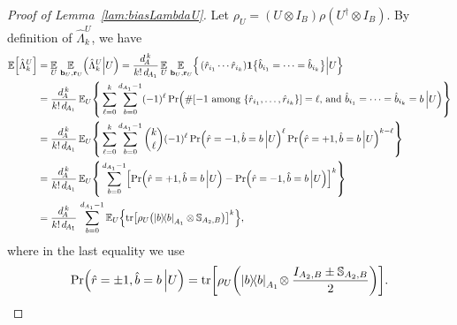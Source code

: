 \documentclass[aps,prl,twocolumn,nofootinbib,superscriptaddress,10pt]{revtex4-2}
\let\originalleft\left
\let\originalright\right
\renewcommand{\left}{\mathopen{}\mathclose\bgroup\originalleft}
\renewcommand{\right}{\aftergroup\egroup\originalright}
\def\E{ {\mathbb E} } %
\newcommand{\ketbra}[2]{\ensuremath{\left|#1\right\rangle\!\left\langle#2\right|}}
\DeclareMathOperator{\Tr}{tr}
\theoremstyle{plain}
\theoremstyle{definition}
\newcommand{\lref}[1]{Lemma~\ref{#1}}
\begin{document}
\begin{proof}[Proof of \lref{lam:biasLambdaU}]
Let $\rho_{U}=(U\otimes I_B)\rho(U^{\dag}\otimes I_B)$. By definition of \(\hat{\Lambda}_k^U\), we have
\begin{align}\label{eq:ELambdaU1}
\E \left[ \hat{\Lambda}_k^{U} \right]
&=\underset{U }{\E} \, \underset{\,\mathbf{b}_{U},\mathbf{r}_{U}}{\E} 
\left( \hat{\Lambda}_k^{U} \Big| U \right)
= \frac{d_{\!A}^{\,k}}{k! \,d_{\!A_1}} \, \underset{U }{\E} \, \underset{\,\mathbf{b}_{U},\mathbf{r}_{U}}{\E} 
\left\{ \left. \left( \hat{r}_{i_1}\cdots \hat{r}_{i_k} \right)  \textbf{1}\big\{\hat{b}_{i_1}=\dots=\hat{b}_{i_k}\big\} \right| U \right\} 
\nonumber \\
&=  \frac{d_{\!A}^{\,k}}{k! \,d_{\!A_1}} \, \E_{U} \left\lbrace \, \sum_{\ell=0}^k \sum_{b=0}^{d_{A_1}-1} (-1)^{\ell} 
\Pr\left(\#\left[ \text{$-1$ among $\left\lbrace \hat{r}_{i_1},\dots, \hat{r}_{i_k}\right\rbrace $}\right] =\ell,\, \text{and } \hat{b}_{i_1}=\dots=\hat{b}_{i_k}=b \,\Big| U \right)  \right\rbrace 
\nonumber \\
&=  \frac{d_{\!A}^{\,k}}{k! \,d_{\!A_1}} \, \E_{U} \left\lbrace \,\sum_{\ell=0}^k \sum_{b=0}^{d_{A_1}-1} \binom{k}{\ell} (-1)^{\ell} 
\Pr\left(\hat{r}=-1, \hat{b}=b \,\Big| U\right)^\ell \Pr\left(\hat{r}=+1, \hat{b}=b\,\Big| U\right)^{k-\ell} \right\rbrace 
\nonumber \\
&=  \frac{d_{\!A}^{\,k}}{k! \,d_{\!A_1}} \, \E_{U} \left\lbrace \,\sum_{b=0}^{d_{A_1}-1} 
\left[ \Pr\left(\hat{r}=+1, \hat{b}=b\,\Big| U\right)-\Pr\left(\hat{r}=-1, \hat{b}=b \,\Big| U\right) \right]^k \right\rbrace 
\nonumber \\
&=  \frac{d_{\!A}^{\,k}}{k! \,d_{\!A_1}} \, \sum_{b=0}^{d_{A_1}-1} 
\E_{U} \left\lbrace  \Tr\left[\rho_{U} \left( \ketbra{b}{b}_{A_1} \otimes \mathbb{S}_{A_2,B} \right)  \right]^k \right\rbrace ,
\end{align}
where in the last equality we use 
\begin{align}
\Pr\left(\hat{r}=\pm 1, \hat{b}=b\,\Big| U\right) = 
\Tr\left[\rho_{U} \left( \ketbra{b}{b}_{A_1} \!\otimes \frac{I_{A_2,B}\pm\mathbb{S}_{A_2,B}}{2} \right)  \right].  
\end{align}


\end{proof}
\end{document}
